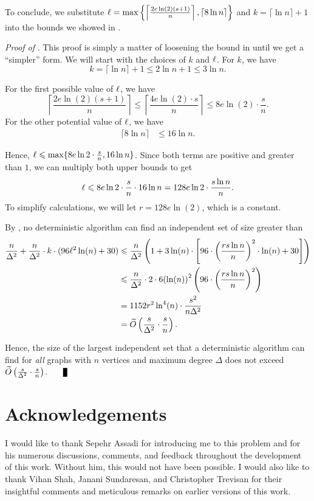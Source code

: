 \documentclass[11pt]{article}
\begin{document}
To conclude, we substitute ${\ell}=\max\left\{\left\lceil\frac{2e\ln(2)(s+1)}n \right\rceil, \left\lceil8\ln n\right\rceil\right\}$ and $k=\lceil \ln n\rceil +1$ into the bounds we showed in .

\noindent
\textit{Proof of }. This proof is simply a matter of loosening the bound in  until we get a ``simpler'' form. We will start with the choices of $k$ and ${\ell}$. For $k$, we have
    \[
        k=\lceil\ln n\rceil+1 \le 2\ln n+1\le 3\ln n.
    \]

For the first possible value of $\ell$, we have
\[ 
    \left\lceil\frac{2e\ln(2)(s+1)}n \right\rceil\le \left\lceil\frac{4e\ln(2)\cdot s}n \right\rceil\le 8e\ln(2)\cdot \frac sn.
\]
For the other potential value of $\ell$, we have
\begin{align*}
    \lceil 8\ln n\rceil&\le 16\ln n.
\end{align*}

Hence, ${\ell}\leqslant \max\{8e\ln 2\cdot \frac sn, 16\ln n\}$. Since both terms are positive and greater than $1$, we can multiply both upper bounds to get
\begin{align*}
    {\ell}\leqslant 8e\ln 2\cdot \frac sn\cdot 16\ln n=128e\ln 2\cdot \frac {s\ln n}n.
\end{align*}
To simplify calculations, we will let $r=128e\ln(2)$, which is a constant.

By , no deterministic algorithm can find an independent set of size greater than
\begin{align*}
\frac{n}{\Delta^2}+\frac{n}{\Delta^2}\cdot k\cdot (96{\ell}^2\ln(n)+30)&\leqslant \frac n{\Delta^2}\left(1+3\ln(n)\cdot \left[96\cdot {\left(\frac{rs\ln n}n\right)}^2\cdot \ln(n)+30\right]\right)\\
&\leqslant \frac n{\Delta^2}\cdot 2\cdot 6{(\ln(n))}^2\left(96\cdot {\left(\frac{rs\ln n}n\right)}^2\right)\\
&=1152r^2\ln^4(n)\cdot\frac{s^2}{n\Delta^2}\\
&= \widetilde{O}\left(\frac s{\Delta^2}\cdot \frac sn\right).
\end{align*}

Hence, the size of the largest independent set that a deterministic algorithm can find for \textit{all} graphs with $n$ vertices and maximum degree $\Delta$ does not exceed $\widetilde{O}\left(\frac s{\Delta^2}\cdot \frac sn\right)$. $\qed$

\section*{Acknowledgements}
I would like to thank Sepehr Assadi for introducing me to this problem and for his numerous discussions, comments, and feedback throughout the development of this work. Without him, this would not have been possible. I would also like to thank Vihan Shah, Janani Sundaresan, and Christopher Trevisan for their insightful comments and meticulous remarks on earlier versions of this work.



\end{document}
